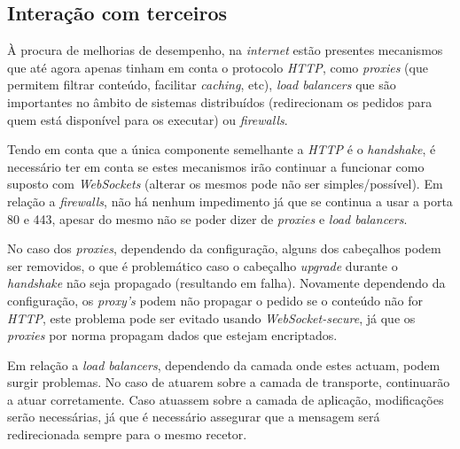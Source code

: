 \documentclass[a4paper]{article}
\begin{document}
\subsection{Interação com terceiros} 

À procura de melhorias de desempenho, na \emph{internet} estão presentes mecanismos que até agora apenas tinham em conta o protocolo \emph{HTTP}, como \emph{proxies} (que permitem filtrar conteúdo, facilitar \emph{caching}, etc), \emph{load balancers} que são importantes no âmbito de sistemas distribuídos (redirecionam os pedidos para quem está disponível para os executar) ou \emph{firewalls}.

Tendo em conta que a única componente semelhante a \emph{HTTP} é o \emph{handshake}, é necessário ter em conta se estes mecanismos irão continuar a funcionar como suposto com \emph{WebSockets} (alterar os mesmos pode não ser simples/possível). Em relação a \emph{firewalls}, não há nenhum impedimento já que se continua a usar a porta 80 e 443, apesar do mesmo não se poder dizer de \emph{proxies} e \emph{load balancers}.

No caso dos \emph{proxies}, dependendo da configuração, alguns dos cabeçalhos podem ser removidos, o que é problemático caso o cabeçalho \emph{upgrade} durante o \emph{handshake} não seja propagado (resultando em falha). Novamente dependendo da configuração, os \emph{proxy's} podem não propagar o pedido se o conteúdo não for \emph{HTTP}, este problema pode ser evitado usando \emph{WebSocket-secure}, já que os \emph{proxies} por norma propagam dados que estejam encriptados. 

Em relação a \emph{load balancers}, dependendo da camada onde estes actuam, podem surgir problemas. No caso de atuarem sobre a camada de transporte, continuarão a atuar corretamente. Caso atuassem sobre a camada de aplicação, modificações serão necessárias, já que é necessário assegurar que a mensagem será redirecionada sempre para o mesmo recetor.
\end{document}
